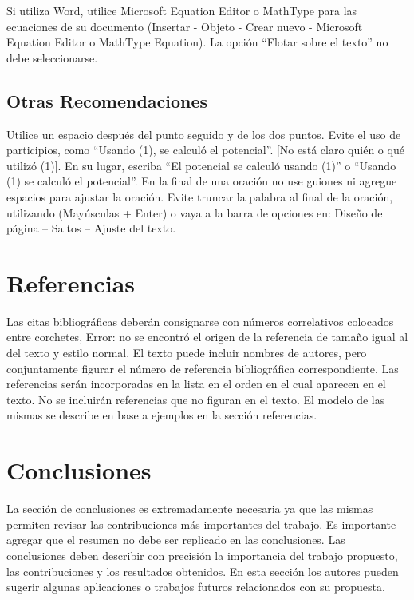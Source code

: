 \documentclass[a4paper, 12pt]{article}
\begin{document}
Si utiliza Word, utilice Microsoft Equation Editor o MathType para las ecuaciones de su
documento (Insertar - Objeto - Crear nuevo - Microsoft Equation Editor o MathType Equation). La
opción “Flotar sobre el texto” no debe seleccionarse.

\subsection{Otras Recomendaciones}

Utilice un espacio después del punto seguido y de los dos puntos. Evite el uso de participios, como
“Usando (1), se calculó el potencial”. [No está claro quién o qué utilizó (1)]. En su lugar, escriba “El
potencial se calculó usando (1)” o “Usando (1) se calculó el potencial”. En la final de una oración no
use guiones ni agregue espacios para ajustar la oración. Evite truncar la palabra al final de la oración,
utilizando (Mayúsculas + Enter) o vaya a la barra de opciones en: Diseño de página – Saltos – Ajuste
del texto.

\section{Referencias}

Las citas bibliográficas deberán consignarse con números correlativos colocados entre corchetes,
Error: no se encontró el origen de la referencia de tamaño igual al del texto y estilo normal. El texto
puede incluir nombres de autores, pero conjuntamente figurar el número de referencia bibliográfica
correspondiente. Las referencias serán incorporadas en la lista en el orden en el cual aparecen en el
texto. No se incluirán referencias que no figuran en el texto. El modelo de las mismas se describe en
base a ejemplos en la sección referencias.

\section{Conclusiones}

La sección de conclusiones es extremadamente necesaria ya que las mismas permiten revisar las
contribuciones más importantes del trabajo. Es importante agregar que el resumen no debe ser
replicado en las conclusiones. Las conclusiones deben describir con precisión la importancia del
trabajo propuesto, las contribuciones y los resultados obtenidos. En esta sección los autores pueden
sugerir algunas aplicaciones o trabajos futuros relacionados con su propuesta.
\end{document}
